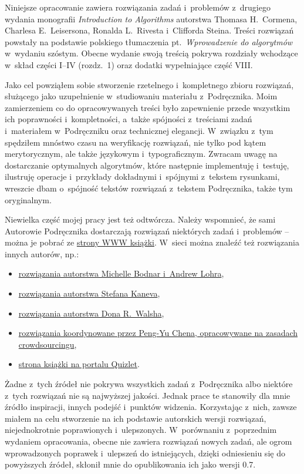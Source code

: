 
Niniejsze opracowanie zawiera rozwiązania zadań i~problemów z~drugiego wydania monografii \textsl{Introduction to Algorithms} \cite{clrs2} autorstwa Thomasa H.\ Cormena, Charlesa E.\ Leisersona, Ronalda L.\ Rivesta i~Clifforda Steina.
Treści rozwiązań powstały na podstawie polskiego tłumaczenia pt.\ \textsl{Wprowadzenie do algorytmów} \cite{clrs2pl} w~wydaniu szóstym.
Obecne wydanie swoją treścią pokrywa rozdziały wchodzące w~skład części I--IV (rozdz.\ 1) oraz dodatki wypełniające część VIII\@.

Jako cel powziąłem sobie stworzenie rzetelnego i~kompletnego zbioru rozwiązań, służącego jako uzupełnienie w~studiowaniu materiału z~Podręcznika.
Moim zamierzeniem co do opracowywanych treści było zapewnienie przede wszystkim ich poprawności i~kompletności, a~także spójności z~treściami zadań i~materiałem w~Podręczniku oraz technicznej elegancji.
W~związku z~tym spędziłem mnóstwo czasu na weryfikację rozwiązań, nie tylko pod kątem merytorycznym, ale także językowym i~typograficznym.
Zwracam uwagę na dostarczanie optymalnych algorytmów, które następnie implementuję i~testuję, ilustruję operacje i~przykłady dokładnymi i~spójnymi z~tekstem rysunkami, wreszcie dbam o~spójność tekstów rozwiązań z~tekstem Podręcznika, także tym oryginalnym.

Niewielka część mojej pracy jest też odtwórcza.
Należy wspomnieć, że sami Autorowie Podręcznika dostarczają rozwiązań niektórych zadań i~problemów -- można je pobrać ze \href{http://mitpress.mit.edu/algorithms}{strony WWW książki}.
W~sieci można znaleźć też rozwiązania innych autorów, np.:
\begin{itemize}
    \item \href{http://sites.math.rutgers.edu/~ajl213/CLRS/CLRS.html}{rozwiązania autorstwa Michelle Bodnar i~Andrew Lohra},
    \item \href{https://ita.skanev.com}{rozwiązania autorstwa Stefana Kaneva},
    \item \href{https://donrwalsh.github.io/CLRS/}{rozwiązania autorstwa Dona R.\ Walsha},
    \item \href{https://walkccc.github.io/CLRS}{rozwiązania koordynowane przez Peng-Yu Chena, opracowywane na zasadach crowdsourcingu},
    \item \href{https://quizlet.com/explanations/textbook-solutions/introduction-to-algorithms-2nd-edition-9780262032933}{strona książki na portalu Quizlet}.
\end{itemize}
Żadne z~tych źródeł nie pokrywa wszystkich zadań z~Podręcznika albo niektóre z~tych rozwiązań nie są najwyższej jakości.
Jednak prace te stanowiły dla mnie źródło inspiracji, innych podejść i~punktów widzenia.
Korzystając z~nich, zawsze miałem na celu stworzenie na ich podstawie autorskich wersji rozwiązań, niejednokrotnie poprawionych i~ulepszonych.
W~porównaniu z~poprzednim wydaniem opracowania, obecne nie zawiera rozwiązań nowych zadań, ale ogrom wprowadzonych poprawek i~ulepszeń do istniejących, dzięki odniesieniu się do powyższych źródeł, skłonił mnie do opublikowania ich jako wersji 0.7.


